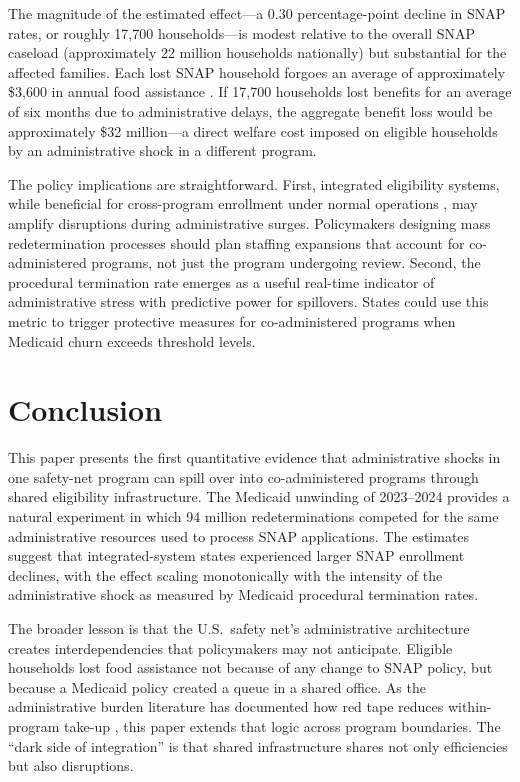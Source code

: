 \documentclass[12pt]{article}
\begin{document}
The magnitude of the estimated effect---a 0.30 percentage-point decline in SNAP rates, or roughly 17,700 households---is modest relative to the overall SNAP caseload (approximately 22 million households nationally) but substantial for the affected families. Each lost SNAP household forgoes an average of approximately \$3,600 in annual food assistance \citep{hoynes2016}. If 17,700 households lost benefits for an average of six months due to administrative delays, the aggregate benefit loss would be approximately \$32 million---a direct welfare cost imposed on eligible households by an administrative shock in a different program.

The policy implications are straightforward. First, integrated eligibility systems, while beneficial for cross-program enrollment under normal operations \citep{finkelstein2019}, may amplify disruptions during administrative surges. Policymakers designing mass redetermination processes should plan staffing expansions that account for co-administered programs, not just the program undergoing review. Second, the procedural termination rate emerges as a useful real-time indicator of administrative stress with predictive power for spillovers. States could use this metric to trigger protective measures for co-administered programs when Medicaid churn exceeds threshold levels.


\section{Conclusion}
\label{sec:conclusion}

This paper presents the first quantitative evidence that administrative shocks in one safety-net program can spill over into co-administered programs through shared eligibility infrastructure. The Medicaid unwinding of 2023--2024 provides a natural experiment in which 94 million redeterminations competed for the same administrative resources used to process SNAP applications. The estimates suggest that integrated-system states experienced larger SNAP enrollment declines, with the effect scaling monotonically with the intensity of the administrative shock as measured by Medicaid procedural termination rates.

The broader lesson is that the U.S.\ safety net's administrative architecture creates interdependencies that policymakers may not anticipate. Eligible households lost food assistance not because of any change to SNAP policy, but because a Medicaid policy created a queue in a shared office. As the administrative burden literature has documented how red tape reduces within-program take-up \citep{herd2015, bhargava2015, finkelstein2019}, this paper extends that logic across program boundaries. The ``dark side of integration'' is that shared infrastructure shares not only efficiencies but also disruptions.
\end{document}

